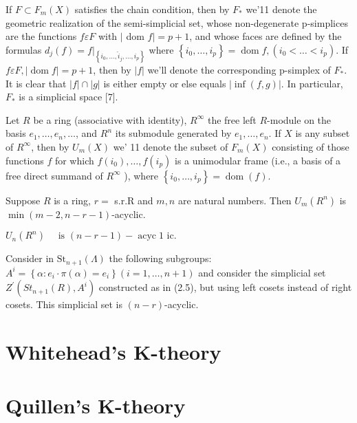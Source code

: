If $F \subset F_m(X)$ satisfies the chain condition, then by $F_*$ we'11 denote the geometric realization of the semi-simplicial set, whose non-degenerate p-simplices are the functions $f \varepsilon F$ with $\mid$ dom $f \mid=p+1$, and whose faces are defined by the formulas $d_j(f)=\left.f\right|_{\left\{i_0, \ldots, \hat{i}_j, \ldots, i_p\right\}}$ where $\left\{i_0, \ldots, i_p\right\}=\operatorname{dom} f,\left(i_0<\ldots<i_p\right)$. If $f \varepsilon F,|\operatorname{dom} f|=p+1$, then by $|f|$ we'll denote the corresponding p-simplex of $F_*$. It is clear that $|f| \cap|g|$ is either empty or else equals $|\inf (f, g)|$. In particular, $F_*$ is a simplicial space [7].

Let $R$ be a ring (associative with identity), $R^{\infty}$ the free left $R$-module on the basis $e_1, \ldots, e_n, \ldots$, and $R^n$ its submodule generated by $e_1, \ldots, e_n$. If $X$ is any subset of $R^{\infty}$, then by $U_m(X)$ we' 11 denote the subset of $F_m(X)$ consisting of those functions $f$ for which $f\left(i_0\right), \ldots, f\left(i_p\right)$ is a unimodular frame (i.e., a basis of a free direct summand of $R^{\infty}$ ), where $\left\{i_0, \ldots, i_p\right\}=\operatorname{dom}(f)$.

\begin{theo}
Suppose $R$ is a ring, $r=$ s.r.R and $m, n$ are natural numbers. Then $U_m\left(R^n\right)$ is $\min (m-2, n-r-1)$-acyclic.
\end{theo}


\begin{coro}
    $U_n\left(R^n\right) \quad \text { is }(n-r-1)-\operatorname{acyc} 1 \text { ic. }$
\end{coro}

\begin{coro}
Consider in $\mathrm{St}_{n+1}(\Lambda)$ the following subgroups: $A^i=\left\{\alpha: e_i \cdot \pi(\alpha)=e_i\right\}(i=1, \ldots, n+1)$ and consider the simplicial set $Z^{\prime}\left(S t_{n+1}(R), A^i\right)$ constructed as in (2.5), but using left cosets instead of right cosets. This simplicial set is $(n-r)$-acyclic.  
\end{coro}














\section{Whitehead's K-theory}

\section{Quillen's K-theory}
